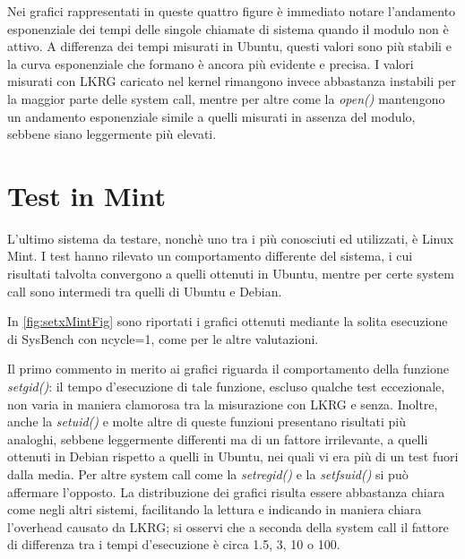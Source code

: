 Nei grafici rappresentati in queste quattro figure è immediato notare l'andamento esponenziale dei tempi delle singole chiamate di sistema quando il modulo non è attivo. A differenza dei tempi misurati in Ubuntu, questi valori sono più stabili e la curva esponenziale che formano è ancora più evidente e precisa. I valori misurati con LKRG caricato nel kernel rimangono invece abbastanza instabili per la maggior parte delle system call, mentre per altre come la \emph{open()} mantengono un andamento esponenziale simile a quelli misurati in assenza del modulo, sebbene siano leggermente più elevati.

\section{Test in Mint}

L'ultimo sistema da testare, nonchè uno tra i più conosciuti ed utilizzati, è Linux Mint. I test hanno rilevato un comportamento differente del sistema, i cui risultati talvolta convergono a quelli ottenuti in Ubuntu, mentre per certe system call sono intermedi tra quelli di Ubuntu e Debian.

In \autoref{fig:setxMintFig} sono riportati i grafici ottenuti mediante la solita esecuzione di SysBench con ncycle=1, come per le altre valutazioni.

Il primo commento in merito ai grafici riguarda il comportamento della funzione \emph{setgid()}: il tempo d'esecuzione di tale funzione, escluso qualche test eccezionale, non varia in maniera clamorosa tra la misurazione con LKRG e senza. Inoltre, anche la \emph{setuid()} e molte altre di queste funzioni presentano risultati più analoghi, sebbene leggermente differenti ma di un fattore irrilevante, a quelli ottenuti in Debian rispetto a quelli in Ubuntu, nei quali vi era più di un test fuori dalla media.
Per altre system call come la \emph{setregid()} e la \emph{setfsuid()} si può affermare l'opposto. La distribuzione dei grafici risulta essere abbastanza chiara come negli altri sistemi, facilitando la lettura e indicando in maniera chiara l'overhead causato da LKRG; si osservi che a seconda della system call il fattore di differenza tra i tempi d'esecuzione è circa 1.5, 3, 10 o 100.

